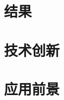 \documentclass[UTF8, twocolumn ]{ctexart}
\begin{document}

\section{结果}


\section{技术创新}


\section{应用前景}

\end{document}
